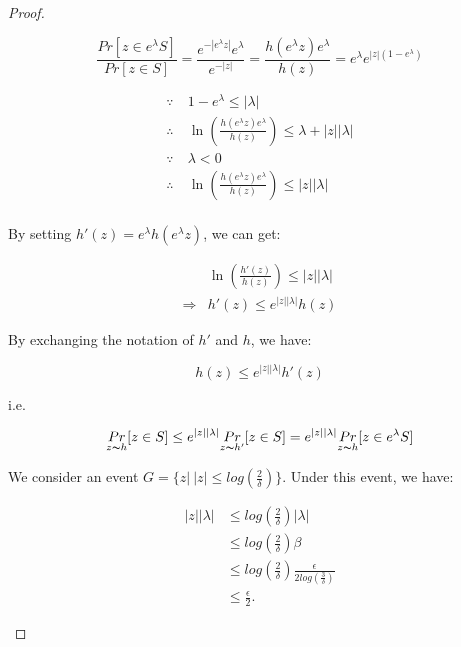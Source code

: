 \begin{proof}
\begin{itemize}
	\begin{equation*}
	\frac{Pr[z\in e^{\lambda} S]}{Pr[z\in S]} 
	= \frac{e^{-|e^{\lambda}z|} e^{\lambda}}{e^{-|z|}} 
	= \frac{h(e^{\lambda} z) e^{\lambda}}{h(z)} 
	= e^{\lambda}e^{|z|(1 - e^{\lambda})}
	\end{equation*}



	\begin{equation*}
	\begin{split}
	\because\	& 1 - e^{\lambda} \leq |\lambda| \\
	\therefore\	& \ln (\frac{h(e^{\lambda} z) e^{\lambda}}{h(z)} )
	\leq \lambda + |z||\lambda|\\
	\because\	& \lambda < 0\\
	\therefore\	& \ln (\frac{h(e^{\lambda} z) e^{\lambda}}{h(z)} )
	\leq |z||\lambda|\\
	\end{split}
	\end{equation*}

	By setting $h'(z) = e^{\lambda} h(e^{\lambda} z)$, we can get:

	\begin{equation*}
	\begin{split}
	&\ln(\frac{h'(z)}{h(z)}) \leq |z||\lambda|\\
	\Rightarrow & h'(z)\leq  e^{|z||\lambda|}h(z)
	\end{split}
	\end{equation*}

	By exchanging the notation of $h'$ and $h$, we have:

	\begin{equation*}
	h(z) \leq e^{|z||\lambda|}h'(z)
	\end{equation*}

	i.e.

	\begin{equation*}
	\underset{z \thicksim h}{Pr}[z \in S] 
	\leq  e^{|z||\lambda|}\underset{z \thicksim h'}{Pr}[z \in S]
	= e^{|z||\lambda|}\underset{z \thicksim h}{Pr}[z \in e^{\lambda} S]
	\end{equation*}

	We consider an event $G = \{z |\ |z|\leq log(\frac{2}{\delta}) \}$. Under this event, we have:

	\begin{equation*}
	\begin{split}
	|z||\lambda| 	& \leq log(\frac{2}{\delta})|\lambda|\\
					& \leq log(\frac{2}{\delta}) \beta\\
					&\leq log(\frac{2}{\delta})\frac{\epsilon}{2 log(\frac{3}{\delta})} \\
					&\leq \frac{\epsilon}{2}.
	\end{split}
	\end{equation*}


\end{itemize}
\end{proof}
